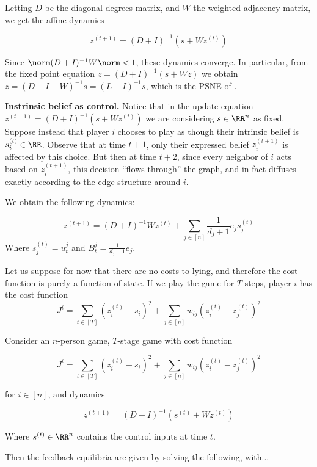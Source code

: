 Letting $D$ be the diagonal degrees matrix, and $W$ the weighted adjacency matrix, we get the affine dynamics 

\[
z^{(t+1)} = (D + I)^{-1} (s + W z^{(t)})
\]

Since $\norm (D+I)^{-1} W \norm < 1$, these dynamics converge. In particular, from the fixed point equation $z = (D + I)^{-1} (s + Wz)$ we obtain $z = (D + I - W)^{-1} s = (L + I)^{-1} s$, which is the PSNE of \cite{bindel2011}. 

{\bf Instrinsic belief as control.} Notice that in the update equation $z^{(t+1)} = (D + I)^{-1} (s + W z^{(t)})$ we are considering $s \in \RR^n$ as fixed. Suppose instead that player $i$ chooses to play as though their intrinsic belief is $s_{i}^{(t)} \in \RR$. Observe that at time $t + 1$, only their expressed belief $z_{i}^{(t+1)}$ is affected by this choice. But then at time $t + 2$, since every neighbor of $i$ acts based on $z_{i}^{(t+1)}$, this decision ``flows through'' the graph, and in fact diffuses exactly according to the edge structure around $i$. 

We obtain the following dynamics:  

\[
z^{(t+1)} = (D + I)^{-1} W z^{(t)} + \sum_{j \in [n]} \frac{1}{d_{j} + 1} e_j s_j^{(t)}
\]
Where $s_j^{(t)} = u_t^j$ and $B_t^j = \frac{1}{d_{j} + 1} e_j$. 

Let us suppose for now that there are no costs to lying, and therefore the cost function is purely a function of state. If we play the game for $T$ steps, player $i$ has the cost function 
\[
J^i = \sum_{t \in [T]} (z_i^{(t)} - s_i)^2 + \sum_{j \in [n]} w_{ij} (z_i^{(t)} - z_j^{(t)})^2 
\]

\begin{theorem}
Consider an $n$-person game, $T$-stage game with cost function 

\[
J^i = \sum_{t \in [T]} (z_i^{(t)} - s_i)^2 + \sum_{j \in [n]} w_{ij} (z_i^{(t)} - z_j^{(t)})^2 
\]

for $i \in [n]$, and dynamics    

\[
z^{(t+1)} = (D + I)^{-1} (s^{(t)} + W z^{(t)})
\]

Where $s^{(t)} \in \RR^n$ contains the control inputs at time $t$. 

Then the feedback equilibria are given by solving the following, with... 
\end{theorem}

